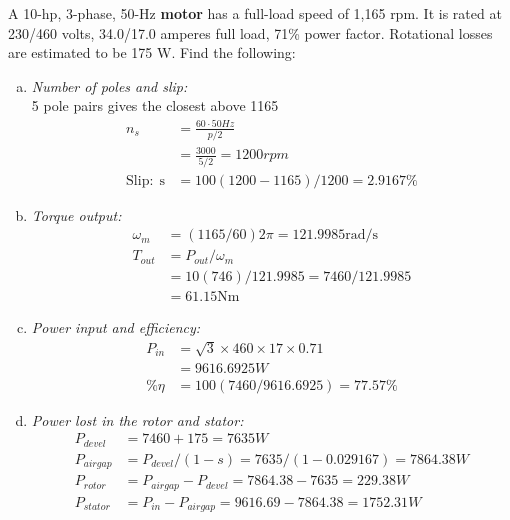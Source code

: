 \documentclass[a4paper,11pt]{article}
\begin{document}
A 10-hp, 3-phase, 50-Hz \textbf{motor} has a full-load speed of 1,165 rpm. It is rated at 230/460 volts, 34.0/17.0 amperes full load, 71\% power factor. Rotational losses are estimated to be 175 W. Find the following:

\begin{enumerate}[a)]
    \item \textit{Number of poles and slip:}\\
          5 pole pairs gives the closest above 1165
          \begin{align*}
              n_s               & =\frac{60{\cdot}50Hz}{p/2}    \\
                                & =\frac{3000}{5/2} = 1200rpm   \\
              \mathrm{Slip:\;s} & =100(1200-1165)/1200=2.9167\%
          \end{align*}

    \item \textit{Torque output:}\\
          \begin{align*}
              \omega_m & = (1165/60)2\pi =121.9985 \mathrm{rad/s} \\
              T_{out}  & = P_{out}/\omega_m                       \\
                       & = 10(746)/121.9985=7460/121.9985         \\
                       & =61.15\mathrm{Nm}
          \end{align*}

    \item \textit{Power input and efficiency:}\\
          \begin{align*}
              P_{in} & = \sqrt{3}\times460\times17\times0.71 \\
                     & =9616.6925W                           \\
              \%\eta & = 100(7460/9616.6925)=77.57\%
          \end{align*}

    \item \textit{Power lost in the rotor and stator:}\\
          \begin{align*}
              P_{devel}  & = 7460+175=7635W                               \\
              P_{airgap} & = P_{devel}/(1-s) = 7635/(1-0.029167)=7864.38W \\
              P_{rotor}  & = P_{airgap}-P_{devel} = 7864.38-7635=229.38W  \\
              P_{stator} & = P_{in}-P_{airgap}=9616.69-7864.38=1752.31W   \\
          \end{align*}
\end{enumerate}
\end{document}
